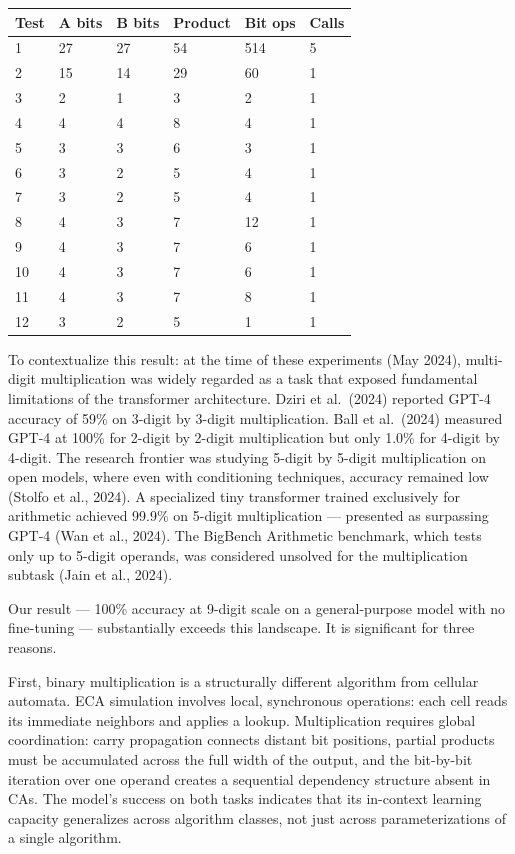 \documentclass[twocolumn,switch,10pt]{article}
\begin{document}
{\def\LTcaptype{none} %
\begin{table}[t]
\centering

\begin{tabular}{@{}llllll@{}}\toprule
Test & A bits & B bits & Product & Bit ops & Calls \\
\midrule

1 & 27 & 27 & 54 & 514 & 5 \\
2 & 15 & 14 & 29 & 60 & 1 \\
3 & 2 & 1 & 3 & 2 & 1 \\
4 & 4 & 4 & 8 & 4 & 1 \\
5 & 3 & 3 & 6 & 3 & 1 \\
6 & 3 & 2 & 5 & 4 & 1 \\
7 & 3 & 2 & 5 & 4 & 1 \\
8 & 4 & 3 & 7 & 12 & 1 \\
9 & 4 & 3 & 7 & 6 & 1 \\
10 & 4 & 3 & 7 & 6 & 1 \\
11 & 4 & 3 & 7 & 8 & 1 \\
12 & 3 & 2 & 5 & 1 & 1 \\
\bottomrule
\end{tabular}
\end{table}
}

To contextualize this result: at the time of these experiments (May 2024), multi-digit multiplication was widely regarded as a task that exposed fundamental limitations of the transformer architecture. Dziri et al.~(2024) reported GPT-4 accuracy of 59\% on 3-digit by 3-digit multiplication. Ball et al.~(2024) measured GPT-4 at 100\% for 2-digit by 2-digit multiplication but only 1.0\% for 4-digit by 4-digit. The research frontier was studying 5-digit by 5-digit multiplication on open models, where even with conditioning techniques, accuracy remained low (Stolfo et al., 2024). A specialized tiny transformer trained exclusively for arithmetic achieved 99.9\% on 5-digit multiplication --- presented as surpassing GPT-4 (Wan et al., 2024). The BigBench Arithmetic benchmark, which tests only up to 5-digit operands, was considered unsolved for the multiplication subtask (Jain et al., 2024).

Our result --- 100\% accuracy at 9-digit scale on a general-purpose model with no fine-tuning --- substantially exceeds this landscape. It is significant for three reasons.

First, binary multiplication is a structurally different algorithm from cellular automata. ECA simulation involves local, synchronous operations: each cell reads its immediate neighbors and applies a lookup. Multiplication requires global coordination: carry propagation connects distant bit positions, partial products must be accumulated across the full width of the output, and the bit-by-bit iteration over one operand creates a sequential dependency structure absent in CAs. The model's success on both tasks indicates that its in-context learning capacity generalizes across algorithm classes, not just across parameterizations of a single algorithm.
\end{document}
